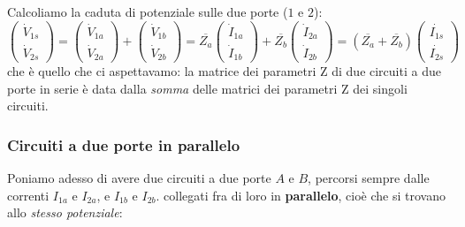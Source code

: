 \documentclass[a4paper,11pt]{article}
\begin{document}
Calcoliamo la caduta di potenziale sulle due porte ($1$ e $2$):
$$
\begin{pmatrix}
	\dot{V}_{1s} \\ \dot{V}_{2s}
\end{pmatrix}
=
\begin{pmatrix}
	\dot{V}_{1a} \\ \dot{V}_{2a}
\end{pmatrix}
+
\begin{pmatrix}
	\dot{V}_{1b} \\ \dot{V}_{2b}
\end{pmatrix}
=
\overline{Z_{a}} 
\begin{pmatrix}
	\dot{I}_{1a} \\ \dot{I}_{1b}
\end{pmatrix}
+
\overline{Z_{b}}
\begin{pmatrix}
	\dot{I}_{2a} \\ \dot{I}_{2b}
\end{pmatrix}
=
\left( \overline{Z_a} + \overline{Z_b} \right) 
\begin{pmatrix}
	\dot{I_{1s}} \\ \dot{I_{2s}}
\end{pmatrix}
$$
che è quello che ci aspettavamo: la matrice dei parametri Z di due circuiti a due porte in serie è data dalla \textit{somma} delle matrici dei parametri Z dei singoli circuiti.

\subsubsection{Circuiti a due porte in parallelo}
Poniamo adesso di avere due circuiti a due porte $A$ e $B$, percorsi sempre dalle correnti $I_{1a}$ e $I_{2a}$, e $I_{1b}$ e $I_{2b}$. collegati fra di loro in \textbf{parallelo}, cioè che si trovano allo \textit{stesso potenziale}:
\end{document}
